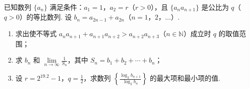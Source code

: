 \begin{problem}
已知数列 \(\{a_n\}\) 满足条件：\(a_1 = 1\)，\(a_2 = r\)（\(r > 0\)），且 \(\{a_n a_{n+1}\}\) 是公比为 \(q\)（\(q > 0\)）的等比数列. 设 \(b_n = a_{2n-1} + a_{2n}\)（\(n = 1\)，\(2\)，\(\dots\)）.
\begin{enumerate}
\item 求出使不等式 \(a_n a_{n+1} + a_{n+1} a_{n+2} > a_{n+2} a_{n+3}\)（\(n \in \mathbb{N}\)）成立时 \(q\) 的取值范围；
\item 求 \(b_n\) 和 \(\lim\limits_{n \to \infty} \frac{1}{S_n}\)，其中 \(S_n = b_1 + b_2 + \cdots + b_n\)；
\item 设 \(r = 2^{19.2} - 1\)，\(q = \frac{1}{2}\)，求数列 \(\left\{\frac{\log_2 b_{n+1}}{\log_2 b_n}\right\}\) 的最大项和最小项的值.
\end{enumerate}
\end{problem}

